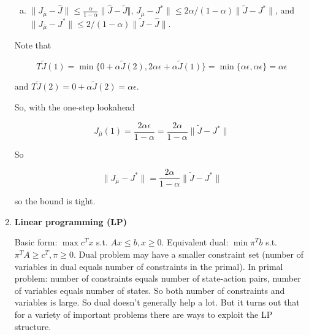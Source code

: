 \begin{enumerate}
\begin{theorem}
\begin{enumerate}[(a)]
\item  \(\lVert J_{\overline{\mu}} - \hat{J} \rVert \leq \frac{\alpha}{1-\alpha} \lVert \hat{J} - \tilde{J} \Vert\), \(J_{\overline{\mu}} - J^* \rVert \leq 2 \alpha/(1-\alpha)  \lVert \tilde{J} - J^* \rVert\), and \( \lVert J_{\overline{\mu}} - J^* \rVert \leq 2/(1-\alpha) \lVert \tilde{J} - \hat{J} \rVert\). 

\end{enumerate}

\end{theorem}

\begin{example}

Note that 

\[
T\tilde{J}(1) = \min\{0 + \alpha \tilde{J}(2), 2 \alpha \epsilon + \alpha \tilde{J}(1)\} = \min\{\alpha \epsilon, \alpha \epsilon\}  = \alpha \epsilon
\]

 and \(T\tilde{J}(2) = 0 + \alpha \tilde{J}(2) = \alpha \epsilon\).

So, with the one-step lookahead

\[
J_{\overline{\mu}}(1) = \frac{2 \alpha \epsilon}{1 - \alpha} =  \frac{2 \alpha}{1 - \alpha} \lVert \tilde{J} - J^* \rVert
\]

So

\[
\lVert J_{\overline{\mu}} - J^* \rVert = \frac{2 \alpha}{1 - \alpha} \lVert \tilde{J} - J^* \rVert
\]

so the bound is tight.

\end{example}

\begin{proposition}

\end{proposition}

\item \textbf{Linear programming (LP)}


Basic form: \(\max c^Tx \) s.t. \(Ax \leq b, x \geq 0\). Equivalent dual: \(\min \pi^Tb \) s.t. \(\pi^TA \geq c^T, \pi \geq 0\). Dual problem may have a smaller constraint set (number of variables in dual equals number of constraints in the primal). In primal problem: number of constraints equals number of state-action pairs, number of variables equals number of states. So both number of constraints and variables is large. So dual doesn't generally help a lot. But it turns out that for a variety of important problems there are ways to exploit the LP structure.

\end{enumerate}


